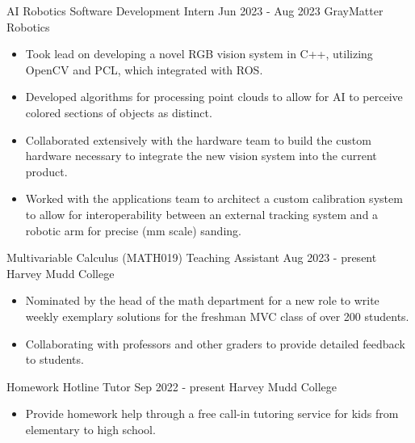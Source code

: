 \documentclass[9pt]{resume}
\begin{document}
    
    \vspace{0.5cm}

    \begin{experiencelist}
        \experience 
            {AI Robotics Software Development Intern}
            {Jun 2023 - Aug 2023}
            {GrayMatter Robotics}
            {\begin{itemize}[noitemsep, topsep=1pt]
                \item Took lead on developing a novel RGB vision system in C++, utilizing OpenCV and PCL, which integrated with ROS.
                \item Developed algorithms for processing point clouds to allow for AI to perceive colored sections of objects as distinct.
                \item Collaborated extensively with the hardware team to build the custom hardware necessary to integrate the new vision system into the current product.
                \item Worked with the applications team to architect a custom calibration system to allow for interoperability between an external tracking system and a robotic arm for precise (mm scale) sanding.
            \end{itemize}}
        \experience 
            {Multivariable Calculus (MATH019) Teaching Assistant}
            {Aug 2023 - present}
            {Harvey Mudd College}
            {\begin{itemize}[noitemsep, topsep=1pt] 
                \item Nominated by the head of the math department for a new role to write weekly exemplary solutions for the freshman MVC class of over 200 students.
                \item Collaborating with professors and other graders to provide detailed feedback to students. 
            \end{itemize}}
        \experience
            {Homework Hotline Tutor}
            {Sep 2022 - present} 
            {Harvey Mudd College}
            {\begin{itemize}[noitemsep, topsep=1pt]
                \item Provide homework help through a free call-in tutoring service for kids from elementary to high school.
            \end{itemize}}
    \end{experiencelist}
\end{document}
